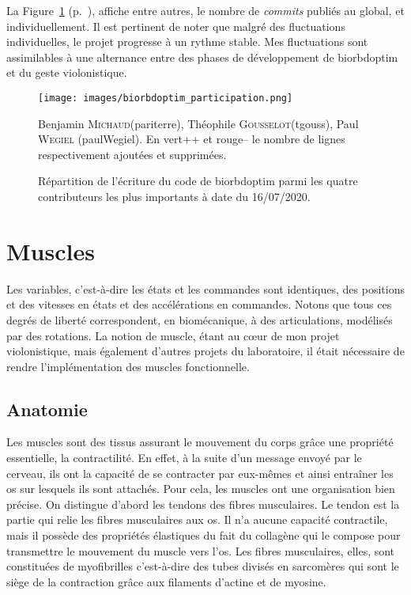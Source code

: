 La Figure~\ref{fig:repartition} (p.~\pageref{fig:repartition}), affiche entre autres, le nombre de \emph{commits} publiés au global, et individuellement. Il est pertinent de noter que malgré des fluctuations individuelles, le projet progresse à un rythme stable. Mes fluctuations sont assimilables à une alternance entre des phases de développement de \gls{biorbdoptim} et du geste violonistique.
\newpage
\begin{figure}[H]
\begin{center}
\texttt{[image: images/biorbdoptim\_participation.png]}
\caption{Répartition de l'écriture du code de \gls{biorbdoptim} parmi les quatre contributeurs les plus importants à date du 16/07/2020.}
\small Benjamin \textsc{Michaud}(pariterre), Théophile \textsc{Gousselot}(tgouss), Paul \textsc{Wegiel} (paulWegiel). En vert++ et rouge-- le nombre de lignes respectivement ajoutées et supprimées.
\label{fig:repartition}
\end{center}
\end{figure}


        \section{Muscles}

Les variables, c'est-à-dire les états et les commandes sont identiques, des positions et des vitesses en états et des accélérations en commandes. Notons que tous ces degrés de liberté correspondent, en biomécanique, à des articulations, modélisés par des rotations. La notion de muscle, étant au cœur de mon projet violonistique, mais également d'autres projets du laboratoire, il était nécessaire de rendre l'implémentation des muscles fonctionnelle.


            \subsection{Anatomie}

Les muscles sont des tissus assurant le mouvement du corps grâce une propriété essentielle, la contractilité. En effet, à la suite d'un message envoyé par le cerveau, ils ont la capacité de se contracter par eux-mêmes et ainsi entraîner les os sur lesquels ils sont attachés.
Pour cela, les muscles ont une organisation bien précise. On distingue d’abord les tendons
des fibres musculaires. Le tendon est la partie qui relie les fibres musculaires aux os. Il n’a aucune capacité contractile, mais il possède des propriétés élastiques du fait du collagène qui le compose pour transmettre le mouvement du muscle vers l’os. Les fibres musculaires, elles, sont constituées de myofibrilles c’est-à-dire des tubes divisés en sarcomères qui sont le siège de la contraction grâce aux filaments d’actine et de myosine. 

